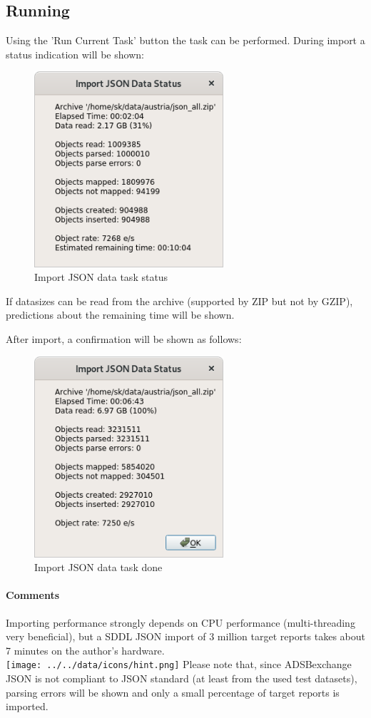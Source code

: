 \subsection{Running}

Using the 'Run Current Task' button the task can be performed. During import a status indication will be shown:

\begin{figure}[H]
  \center
    \includegraphics[width=7cm]{figures/json_import_status.png}
  \caption{Import JSON data task status}
\end{figure}

If datasizes can be read from the archive (supported by ZIP but not by GZIP), predictions about the remaining time will be shown.

After import, a confirmation will be shown as follows:

\begin{figure}[H]
  \center
    \includegraphics[width=7cm,frame]{figures/json_import_done.png}
  \caption{Import JSON data task done}
\end{figure}

\paragraph{Comments}

Importing performance strongly depends on CPU performance (multi-threading very beneficial), but a SDDL JSON import of 3 million target reports takes about 7 minutes on the author's hardware. \\

\texttt{[image: ../../data/icons/hint.png]} Please note that, since ADSBexchange JSON is not compliant to JSON standard (at least from the used test datasets), parsing errors will be shown and only a small percentage of target reports is imported.
